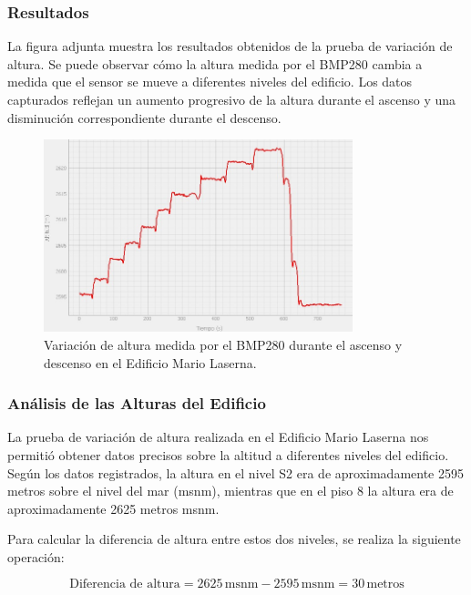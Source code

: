         \subsubsection{Resultados}

            La figura adjunta muestra los resultados obtenidos de la prueba de variación de altura. Se puede observar cómo la altura medida por el BMP280 cambia a medida que el sensor se mueve a diferentes niveles del edificio. Los datos capturados reflejan un aumento progresivo de la altura durante el ascenso y una disminución correspondiente durante el descenso.

            \begin{figure}[H]
                \centering
                \includegraphics[width=0.8\textwidth]{Imagenes/Pruebas/altura.jpg}
                \caption{Variación de altura medida por el BMP280 durante el ascenso y descenso en el Edificio Mario Laserna.}
                \label{fig:variacion_altura}
            \end{figure}

        \subsubsection{Análisis de las Alturas del Edificio}

            La prueba de variación de altura realizada en el Edificio Mario Laserna nos permitió obtener datos precisos sobre la altitud a diferentes niveles del edificio. Según los datos registrados, la altura en el nivel S2 era de aproximadamente 2595 metros sobre el nivel del mar (msnm), mientras que en el piso 8 la altura era de aproximadamente 2625 metros msnm.

            Para calcular la diferencia de altura entre estos dos niveles, se realiza la siguiente operación:

            \[
            \text{Diferencia de altura} = 2625 \, \text{msnm} - 2595 \, \text{msnm} = 30 \, \text{metros}
            \]

